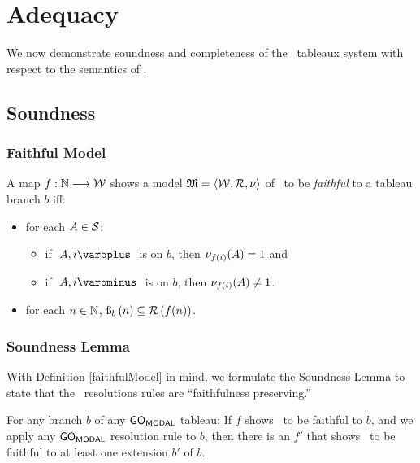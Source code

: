 \section{Adequacy}

\noindent We now demonstrate soundness and completeness of the \GoModal\ tableaux system with respect to the semantics of \Lang{\GoModal}. 

\subsection{Soundness}

\subsubsection{Faithful Model}

\begin{definition}\label{faithfulModel}
A map $ f: \mathbb{N} \longrightarrow \mathcal{W} $ shows a model $\mathfrak{M}=\langle {\ensuremath{\mathcal{W}},\ensuremath{\mathcal{R}},\ensuremath{\mathcal{\nu}}}\rangle$ of \Lang{\GoModal}\ to be \emph{faithful} to a tableau branch $b$ iff:
	\begin{itemize}
		\item for each $ A \in \mathcal{S}$: 
		\begin{itemize}
			\item if $ \like{ \dNode{ A }{ i }} $ is on $ b $, then $ \mathcal{\nu}_{ f(i) }({ A }) = 1 $ and 
			\item if $ \like{ \uNode{ A }{ i }} $ is on $ b $, then $ \mathcal{\nu}_{ f(i) }({ A }) \neq 1 $.
		\end{itemize}
		\item for each $ n \in \mathbb{N} $,
			$ \text{\ss}_{b}\left({n}\right) \subseteq \mathcal{R}\left({ f( n ) }\right) $.
	\end{itemize}
\end{definition}

\subsubsection{Soundness Lemma}

\noindent With Definition \ref{faithfulModel} in mind, we formulate the Soundness Lemma to state that the \GoModal\ resolutions rules are ``faithfulness preserving.''

\begin{lem}\label{soundnessLemma}
For any branch $ b $ of any $ \mathsf{GO}_{\mathsf{MODAL}} $ tableau: If $ f $ shows \Model\ to be faithful to $ b $, and we apply any $ \mathsf{GO}_{\mathsf{MODAL}} $ resolution rule to $ b $, 
	then there is an $ f' $ that shows \Model\ to be faithful to at least one extension $ b' $ of $ b $.
\end{lem}

